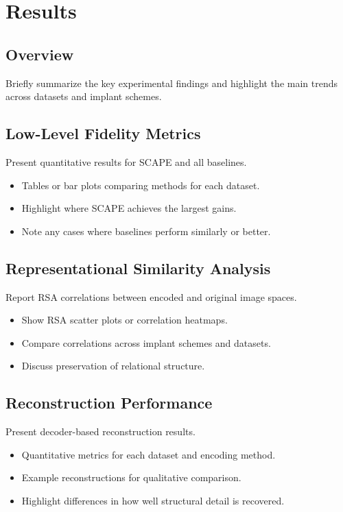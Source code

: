 \section{Results}
\label{sec:results}

\subsection{Overview}
Briefly summarize the key experimental findings and highlight the main trends across datasets and implant schemes.

\subsection{Low-Level Fidelity Metrics}
Present quantitative results for SCAPE and all baselines.
\begin{itemize}
    \item Tables or bar plots comparing methods for each dataset.
    \item Highlight where SCAPE achieves the largest gains.
    \item Note any cases where baselines perform similarly or better.
\end{itemize}

\subsection{Representational Similarity Analysis}
Report RSA correlations between encoded and original image spaces.
\begin{itemize}
    \item Show RSA scatter plots or correlation heatmaps.
    \item Compare correlations across implant schemes and datasets.
    \item Discuss preservation of relational structure.
\end{itemize}

\subsection{Reconstruction Performance}
Present decoder-based reconstruction results.
\begin{itemize}
    \item Quantitative metrics for each dataset and encoding method.
    \item Example reconstructions for qualitative comparison.
    \item Highlight differences in how well structural detail is recovered.
\end{itemize}

